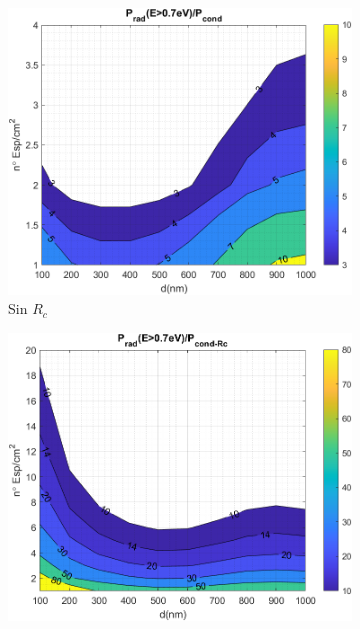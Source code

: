 \begin{figure}[H]
	\centering
	\begin{subfigure}[b]{0.49\textwidth}
		\centering
			\includegraphics[width=1.00\textwidth]{figuras/Resultados/RelacionCondRad/SS.png}
		\caption{Sin $R_c$}
		\label{fig:rel_SsSiO2Ge}
	\end{subfigure}
	\hfill
	\begin{subfigure}[b]{0.49\textwidth}
		\centering
			\includegraphics[width=1.00\textwidth]{figuras/Resultados/RelacionCondRad/SS_Rc_empirico.png}

\end{subfigure}
\end{figure}
